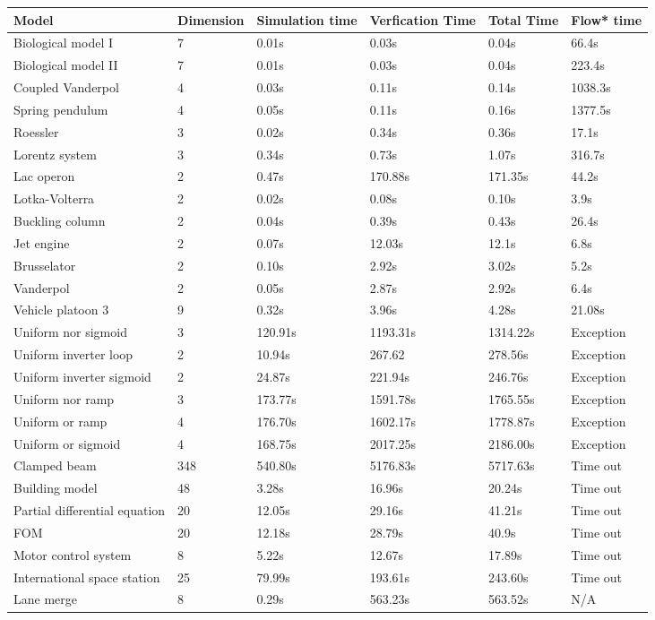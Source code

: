 \documentclass[letterpaper,10pt,english]{sphinxmanual}
\begin{document}
\noindent\begin{tabulary}{\linewidth}{|L|L|L|L|L|L|}
\hline

Model
&
Dimension
&
Simulation time
&
Verfication Time
&
Total Time
&
Flow* time
\\
\hline
Biological model I
&
7
&
0.01s
&
0.03s
&
0.04s
&
66.4s
\\
\hline
Biological model II
&
7
&
0.01s
&
0.03s
&
0.04s
&
223.4s
\\
\hline
Coupled Vanderpol
&
4
&
0.03s
&
0.11s
&
0.14s
&
1038.3s
\\
\hline
Spring pendulum
&
4
&
0.05s
&
0.11s
&
0.16s
&
1377.5s
\\
\hline
Roessler
&
3
&
0.02s
&
0.34s
&
0.36s
&
17.1s
\\
\hline
Lorentz system
&
3
&
0.34s
&
0.73s
&
1.07s
&
316.7s
\\
\hline
Lac operon
&
2
&
0.47s
&
170.88s
&
171.35s
&
44.2s
\\
\hline
Lotka-Volterra
&
2
&
0.02s
&
0.08s
&
0.10s
&
3.9s
\\
\hline
Buckling column
&
2
&
0.04s
&
0.39s
&
0.43s
&
26.4s
\\
\hline
Jet engine
&
2
&
0.07s
&
12.03s
&
12.1s
&
6.8s
\\
\hline
Brusselator
&
2
&
0.10s
&
2.92s
&
3.02s
&
5.2s
\\
\hline
Vanderpol
&
2
&
0.05s
&
2.87s
&
2.92s
&
6.4s
\\
\hline
Vehicle platoon 3
&
9
&
0.32s
&
3.96s
&
4.28s
&
21.08s
\\
\hline
Uniform nor sigmoid
&
3
&
120.91s
&
1193.31s
&
1314.22s
&
Exception
\\
\hline
Uniform inverter loop
&
2
&
10.94s
&
267.62
&
278.56s
&
Exception
\\
\hline
Uniform inverter sigmoid
&
2
&
24.87s
&
221.94s
&
246.76s
&
Exception
\\
\hline
Uniform nor ramp
&
3
&
173.77s
&
1591.78s
&
1765.55s
&
Exception
\\
\hline
Uniform or ramp
&
4
&
176.70s
&
1602.17s
&
1778.87s
&
Exception
\\
\hline
Uniform or sigmoid
&
4
&
168.75s
&
2017.25s
&
2186.00s
&
Exception
\\
\hline
Clamped beam
&
348
&
540.80s
&
5176.83s
&
5717.63s
&
Time out
\\
\hline
Building model
&
48
&
3.28s
&
16.96s
&
20.24s
&
Time out
\\
\hline
Partial differential equation
&
20
&
12.05s
&
29.16s
&
41.21s
&
Time out
\\
\hline
FOM
&
20
&
12.18s
&
28.79s
&
40.9s
&
Time out
\\
\hline
Motor control system
&
8
&
5.22s
&
12.67s
&
17.89s
&
Time out
\\
\hline
International space station
&
25
&
79.99s
&
193.61s
&
243.60s
&
Time out
\\
\hline
Lane merge
&
8
&
0.29s
&
563.23s
&
563.52s
&
N/A
\\
\hline\end{tabulary}
\end{document}

